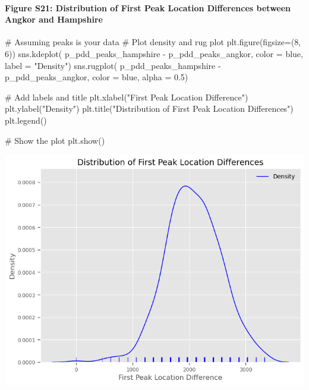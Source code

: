 \documentclass[
  11pt,
  letterpaper,
  DIV=11,
  numbers=noendperiod]{scrartcl}
\let\oldparagraph\paragraph
\renewcommand{\paragraph}[1]{\oldparagraph{#1}\mbox{}}
\newenvironment{Shaded}{\begin{snugshade}}{\end{snugshade}}
\newcommand{\CommentTok}[1]{\textcolor[rgb]{0.37,0.37,0.37}{#1}}
\newcommand{\DecValTok}[1]{\textcolor[rgb]{0.68,0.00,0.00}{#1}}
\newcommand{\FloatTok}[1]{\textcolor[rgb]{0.68,0.00,0.00}{#1}}
\newcommand{\NormalTok}[1]{\textcolor[rgb]{0.00,0.23,0.31}{#1}}
\newcommand{\OperatorTok}[1]{\textcolor[rgb]{0.37,0.37,0.37}{#1}}
\newcommand{\StringTok}[1]{\textcolor[rgb]{0.13,0.47,0.30}{#1}}
\begin{document}
\paragraph{Figure S21: Distribution of First Peak Location Differences
between Angkor and
Hampshire}\label{figure-s21-distribution-of-first-peak-location-differences-between-angkor-and-hampshire}

\begin{Shaded}
\begin{Highlighting}[]
\CommentTok{\# Assuming \textasciigrave{}peaks\textasciigrave{} is your data}
\CommentTok{\# Plot density and rug plot}
\NormalTok{plt.figure(figsize}\OperatorTok{=}\NormalTok{(}\DecValTok{8}\NormalTok{, }\DecValTok{6}\NormalTok{))}
\NormalTok{sns.kdeplot(}
\NormalTok{    p\_pdd\_peaks\_hampshire }\OperatorTok{{-}}\NormalTok{ p\_pdd\_peaks\_angkor, }
\NormalTok{    color }\OperatorTok{=} \StringTok{\textquotesingle{}blue\textquotesingle{}}\NormalTok{, }
\NormalTok{    label }\OperatorTok{=} \StringTok{"Density"}\NormalTok{)}
\NormalTok{sns.rugplot(}
\NormalTok{    p\_pdd\_peaks\_hampshire }\OperatorTok{{-}}\NormalTok{ p\_pdd\_peaks\_angkor, }
\NormalTok{    color }\OperatorTok{=} \StringTok{\textquotesingle{}blue\textquotesingle{}}\NormalTok{, }
\NormalTok{    alpha }\OperatorTok{=} \FloatTok{0.5}\NormalTok{)}

\CommentTok{\# Add labels and title}
\NormalTok{plt.xlabel(}\StringTok{"First Peak Location Difference"}\NormalTok{)}
\NormalTok{plt.ylabel(}\StringTok{"Density"}\NormalTok{)}
\NormalTok{plt.title(}\StringTok{"Distribution of First Peak Location Differences"}\NormalTok{)}
\NormalTok{plt.legend()}

\CommentTok{\# Show the plot}
\NormalTok{plt.show()}
\end{Highlighting}
\end{Shaded}

\includegraphics{analysis_files/figure-pdf/cell-42-output-1.png}
\end{document}
